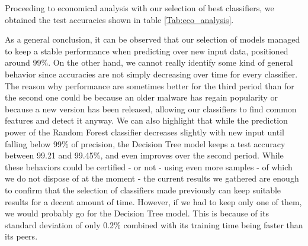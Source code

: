 Proceeding to economical analysis with our selection of best classifiers, we obtained the test accuracies shown in table \ref{Tab:eco_analysis}.

\begin{table}[H]
    \centering
    \captionsetup{justification=centering}
    \caption{Test accuracies collected from running economical analysis over the KNN, LogReg, Decision Tree and Random Forest classifier}
    \label{Tab:eco_analysis}
\end{table}

As a general conclusion, it can be observed that our selection of models managed to keep a stable performance when predicting over new input data, positioned around 99\%. On the other hand, we cannot really identify some kind of general behavior since accuracies are not simply decreasing over time for every classifier. The reason why performance are sometimes better for the third period than for the second one could be because an older malware has regain popularity or because a new version has been released, allowing our classifiers to find common features and detect it anyway.
We can also highlight that while the prediction power of the Random Forest classifier decreases slightly with new input until falling below 99\% of precision, the Decision Tree model keeps a test accuracy between 99.21 and 99.45\%, and even improves over the second period. While these behaviors could be certified - or not - using even more samples - of which we do not dispose of at the moment - the current results we gathered are enough to confirm that the selection of classifiers made previously can keep suitable results for a decent amount of time. However, if we had to keep only one of them, we would probably go for the Decision Tree model. This is because of its standard deviation of only 0.2\% combined with its training time being faster than its peers.